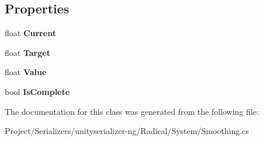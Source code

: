 \subsection*{Properties}
\begin{DoxyCompactItemize}
\item 
\mbox{\label{class_radical_library_1_1_smooth_float_ae7f201544e383a9e177ddcc0fb17c26f}} 
float {\bfseries Current}
\item 
\mbox{\label{class_radical_library_1_1_smooth_float_a0a98318b672e8dca7f2f0c8aa9c08dcd}} 
float {\bfseries Target}
\item 
\mbox{\label{class_radical_library_1_1_smooth_float_a25c40f1975f462233331f9e767684ea1}} 
float {\bfseries Value}
\item 
\mbox{\label{class_radical_library_1_1_smooth_float_a4133452b12ffebb59261bc32fdbf8b9f}} 
bool {\bfseries Is\+Complete}
\end{DoxyCompactItemize}


The documentation for this class was generated from the following file\+:\begin{DoxyCompactItemize}
\item 
Project/\+Serializers/unityserializer-\/ng/\+Radical/\+System/Smoothing.\+cs\end{DoxyCompactItemize}
